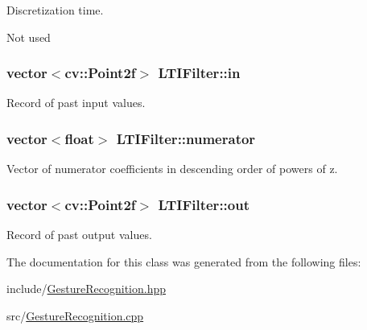 \-Discretization time. 

\-Not used \hypertarget{classLTIFilter_a88e509896075deb20014a50bd1fb8ad3}{
\subsubsection[{in}]{\setlength{\rightskip}{0pt plus 5cm}vector$<$cv\-::\-Point2f$>$ {\bf \-L\-T\-I\-Filter\-::in}}}\label{classLTIFilter_a88e509896075deb20014a50bd1fb8ad3}


\-Record of past input values. 

\hypertarget{classLTIFilter_a974499baf5e9e72be47fad7102378799}{
\subsubsection[{numerator}]{\setlength{\rightskip}{0pt plus 5cm}vector$<$float$>$ {\bf \-L\-T\-I\-Filter\-::numerator}}}\label{classLTIFilter_a974499baf5e9e72be47fad7102378799}


\-Vector of numerator coefficients in descending order of powers of z. 

\hypertarget{classLTIFilter_a7e0e6a2458dfbe2c59e39f9a86d89f97}{
\subsubsection[{out}]{\setlength{\rightskip}{0pt plus 5cm}vector$<$cv\-::\-Point2f$>$ {\bf \-L\-T\-I\-Filter\-::out}}}\label{classLTIFilter_a7e0e6a2458dfbe2c59e39f9a86d89f97}


\-Record of past output values. 



\-The documentation for this class was generated from the following files\-:\begin{DoxyCompactItemize}
\item 
include/\hyperlink{GestureRecognition_8hpp}{\-Gesture\-Recognition.\-hpp}\item 
src/\hyperlink{GestureRecognition_8cpp}{\-Gesture\-Recognition.\-cpp}\end{DoxyCompactItemize}
